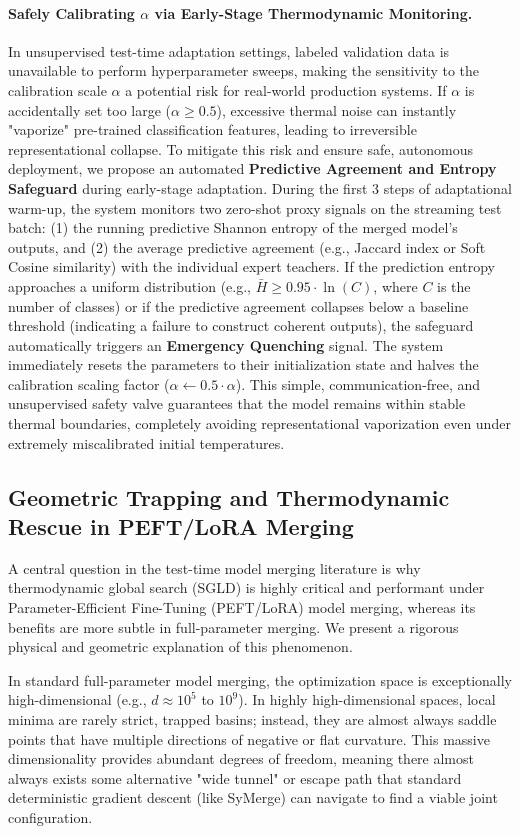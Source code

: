 \paragraph{Safely Calibrating $\alpha$ via Early-Stage Thermodynamic Monitoring.} In unsupervised test-time adaptation settings, labeled validation data is unavailable to perform hyperparameter sweeps, making the sensitivity to the calibration scale $\alpha$ a potential risk for real-world production systems.
If $\alpha$ is accidentally set too large ($\alpha \ge 0.5$), excessive thermal noise can instantly "vaporize" pre-trained classification features, leading to irreversible representational collapse.
To mitigate this risk and ensure safe, autonomous deployment, we propose an automated \textbf{Predictive Agreement and Entropy Safeguard} during early-stage adaptation.
During the first $3$ steps of adaptational warm-up, the system monitors two zero-shot proxy signals on the streaming test batch: (1) the running predictive Shannon entropy of the merged model's outputs, and (2) the average predictive agreement (e.g., Jaccard index or Soft Cosine similarity) with the individual expert teachers.
If the prediction entropy approaches a uniform distribution (e.g., $\bar{H} \ge 0.95 \cdot \ln(C)$, where $C$ is the number of classes) or if the predictive agreement collapses below a baseline threshold (indicating a failure to construct coherent outputs), the safeguard automatically triggers an \textbf{Emergency Quenching} signal.
The system immediately resets the parameters to their initialization state and halves the calibration scaling factor ($\alpha \leftarrow 0.5 \cdot \alpha$).
This simple, communication-free, and unsupervised safety valve guarantees that the model remains within stable thermal boundaries, completely avoiding representational vaporization even under extremely miscalibrated initial temperatures.

\subsection{Geometric Trapping and Thermodynamic Rescue in PEFT/LoRA Merging}
\label{sec:geometric_trapping}
A central question in the test-time model merging literature is why thermodynamic global search (SGLD) is highly critical and performant under Parameter-Efficient Fine-Tuning (PEFT/LoRA) model merging, whereas its benefits are more subtle in full-parameter merging.
We present a rigorous physical and geometric explanation of this phenomenon.

In standard full-parameter model merging, the optimization space is exceptionally high-dimensional (e.g., $d \approx 10^5$ to $10^9$).
In highly high-dimensional spaces, local minima are rarely strict, trapped basins; instead, they are almost always saddle points that have multiple directions of negative or flat curvature.
This massive dimensionality provides abundant degrees of freedom, meaning there almost always exists some alternative "wide tunnel" or escape path that standard deterministic gradient descent (like SyMerge) can navigate to find a viable joint configuration.

